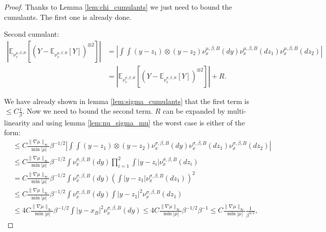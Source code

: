 \documentclass{article}
\numberwithin{theorem}{section}
\begin{document}
\begin{proof}
Thanks to Lemma \ref{lem:chi_cumulants} we just need to bound the cumulants. The first one is already done.

Second cumulant:
\begin{align*}
\left|\mathbb{E}_{\nu_x^{\mu,\beta,B}}[\left(Y-\mathbb{E}_{\nu_x^{\mu,\beta,B}}[Y]\right)^{\otimes 2}]\right|&=\left|\int \int (y-z_1)\otimes(y-z_2) \nu_x^{\mu,\beta,B}(dy) \nu_x^{\mu,\beta,B}(dz_1) \nu_x^{\mu,\beta,B}(dz_2) \right|\\
&=\left|\mathbb{E}_{\nu_x^{\sigma,\beta,B}}[\left(Y-\mathbb{E}_{\nu_x^{\sigma,\beta,B}}[Y]\right)^{\otimes 2}]\right|+R.
\end{align*}

We have already shown in lemma \ref{lem:sigma_cumulants} that the first term is $\leq C\frac{1}{\beta}$. Now we need to bound the second term. $R$ can be expanded by multi-linearity and using lemma \ref{lem:nu_sigma_mu} the worst case is either of the form:
\begin{align*}
&\leq C\frac{\|\nabla \mu\|_\infty}{\min |\mu|}\beta^{-1/2}\left|\int\int (y-z_1)\otimes(y-z_2) \nu_x^{\sigma, \beta, B}(dy) \nu_x^{\sigma, \beta, B}(dz_1) \nu_x^{\sigma, \beta, B}(dz_2)\right|\\
&\leq C \frac{\|\nabla \mu\|_\infty}{\min |\mu|}\beta^{-1/2}\int \nu_x^{\sigma, \beta, B}(dy )\prod_{i=1}^2 \int |y-z_i| \nu_x^{\sigma, \beta, B}(dz_i)\\
&= C\frac{\|\nabla \mu\|_\infty}{\min |\mu|}\beta^{-1/2}\int \nu_x^{\sigma, \beta, B}(dy )\left( \int |y-z_1| \nu_x^{\sigma, \beta, B}(dz_1)\right)^2\\
&\leq C\frac{\|\nabla \mu\|_\infty}{\min |\mu|}\beta^{-1/2}\int \nu_x^{\sigma, \beta, B}(dy )\int |y-z_1| ^2\nu_x^{\sigma, \beta, B}(dz_1)\\
&\leq   4C\frac{\|\nabla \mu\|_\infty}{\min |\mu|}\beta^{-1/2}\int |y-x_B|^2\nu_x^{\sigma, \beta, B}(dy)\leq 4C\frac{\|\nabla \mu\|_\infty}{\min |\mu|}\beta^{-1/2}\beta^{-1}\leq C\frac{\|\nabla \mu\|_\infty}{\min |\mu|}\frac{1}{\beta^{3/2}},
\end{align*}


\end{proof}
\end{document}

